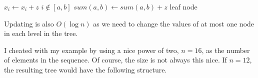 \noindent \begin{minipage}{\textwidth}
\begin{algorithmic}
	\Comment $x_i \gets x_i + z$
		\Comment $i \not\in [a, b]$
		\State \Return
	\EndIf
	\State $sum(a,b) \gets sum(a,b) + z$
		\Comment leaf node
		\State \Return
	\EndIf
	\State {}
	\State {}
\EndFunction
\end{algorithmic}
\end{minipage}

Updating is also $O(\log{n})$ as we need to change the values of at most one node in each level in the tree.

I cheated with my example by using a nice power of two, $n=16$, as the number of elements in the sequence. Of course, the size is not always this nice. If $n=12$, the resulting tree would have the following structure.

